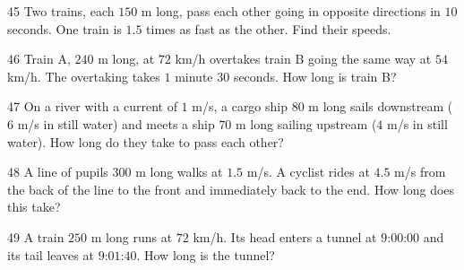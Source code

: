 \gap
\begin{probbox}{45}{}
Two trains, each $150$ m long, pass each other going in opposite directions in $10$ seconds. One train is $1.5$ times as fast as the other. Find their speeds.
\end{probbox}
\gap
\begin{probbox}{46}{}
Train A, $240$ m long, at $72$ km/h overtakes train B going the same way at $54$ km/h. The overtaking takes $1$ minute $30$ seconds. How long is train B?
\end{probbox}
\gap
\begin{probbox}{47}{}
On a river with a current of $1$ m/s, a cargo ship $80$ m long sails downstream ($6$ m/s in still water) and meets a ship $70$ m long sailing upstream ($4$ m/s in still water). How long do they take to pass each other?
\end{probbox}
\gap
\begin{probbox}{48}{}
A line of pupils $300$ m long walks at $1.5$ m/s. A cyclist rides at $4.5$ m/s from the back of the line to the front and immediately back to the end. How long does this take?
\end{probbox}
\gap
\begin{probbox}{49}{}
A train $250$ m long runs at $72$ km/h. Its head enters a tunnel at $9$:$00$:$00$ and its tail leaves at $9$:$01$:$40$. How long is the tunnel?
\end{probbox}
